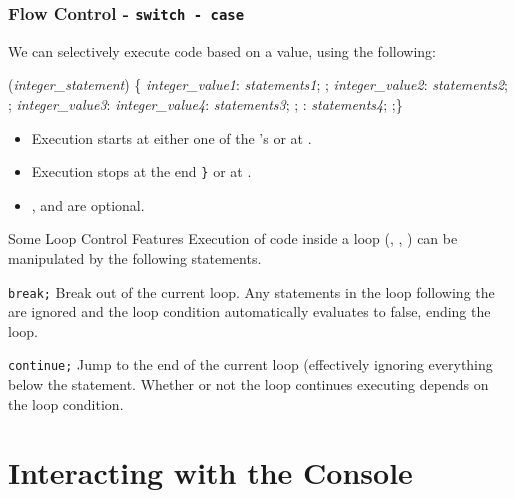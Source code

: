 \documentclass[smaller,table]{beamer} %
\begin{document}
\begin{frame}[fragile]
\frametitle{Flow Control - \tt switch - case}
We can selectively execute code based on a value, using the following:
\begin{block}{}
\begin{semiverbatim}
    (\emph{integer\_statement}) \{
    \emph{integer\_value1}: \emph{statements1}; ;
    \emph{integer\_value2}: \emph{statements2}; ;
    \emph{integer\_value3}:
    \emph{integer\_value4}: \emph{statements3}; ;   
   : \emph{statements4}; ;\}
\end{semiverbatim}
\end{block}
\begin{itemize}
\item Execution starts at either one of the 's or at .
\item Execution stops at the end {\tt\}} or at .
\item {},  and  are optional.
\end{itemize}
\end{frame}

\begin{frame}{Some Loop Control Features}
Execution of code inside a loop (, , )
can be manipulated by the following statements.
\begin{block}{\tt break;}
Break out of the current loop. Any statements in the loop following the  are ignored and the loop condition automatically evaluates to false, ending the loop.
\end{block}
\begin{block}{\tt continue;}
Jump to the end of the current loop (effectively ignoring everything below the  statement. Whether or not the loop continues executing depends on the loop condition.
\end{block}
\end{frame}

\section{Interacting with the Console}
\end{document}
